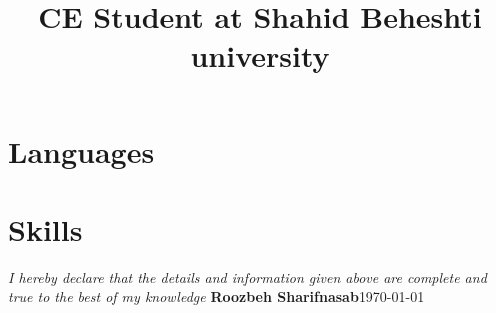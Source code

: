 \documentclass[11pt, a4paper, color, final]{moderncv}
\title{CE Student at Shahid Beheshti university}
\begin{document}
\maketitle





\section{Languages}

\section{Skills}













\iffalse
\section{References}
\begin{cvcolumns}
  \begin{itemize}\item Prof.\ Sadegh Aliakbari\item Mr.\ Parham Alvani\item Prof.\ Mojtaba Vahidi\end{itemize}
\end{cvcolumns}
\fi

\emptysection{}\closesection{}
\vfill
\textit{I hereby declare that the details and information given above are complete and true to the best of my knowledge}
\linebreak
\textbf{Roozbeh Sharifnasab}\hfil\today
\end{document}
